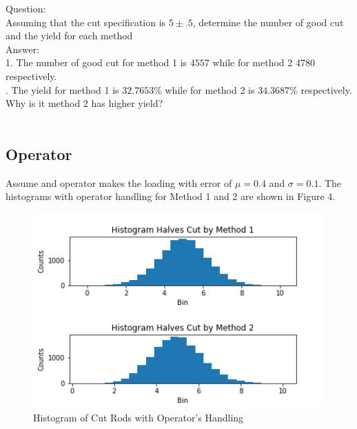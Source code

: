 \documentclass[10pt,journal,compsoc]{IEEEtran} \ifCLASSOPTIONcompsoc
\begin{document}
\noindent Question: \\ Assuming that the cut specification is $5 \pm .5$, determine the number    of good cut and the yield for each method \\ 
\noindent Answer: \\ 1. The number of good cut for method 1 is $4557 $ while for method 2 $4780 $ respectively. \\ 
. The yield for method 1 is $32.7653 $\% while for method 2 is $34.3687 $\% respectively. Why is it method 2 has higher yield? \\ \\    \subsection{Operator}    Assume and operator makes the loading with error of $\mu = 0.4 $ and $\sigma = 0.1 $. 
\noindent The histograms with operator handling for Method 1 and 2 are shown in     Figure 4.
\begin{figure}[H]
\centering\includegraphics[width=1\linewidth,height=0.25\textheight]{Fig04}
\caption{Histogram of Cut Rods with    Operator's Handling}
\label{fig:Fig04}
\end{figure}
\end{document}
